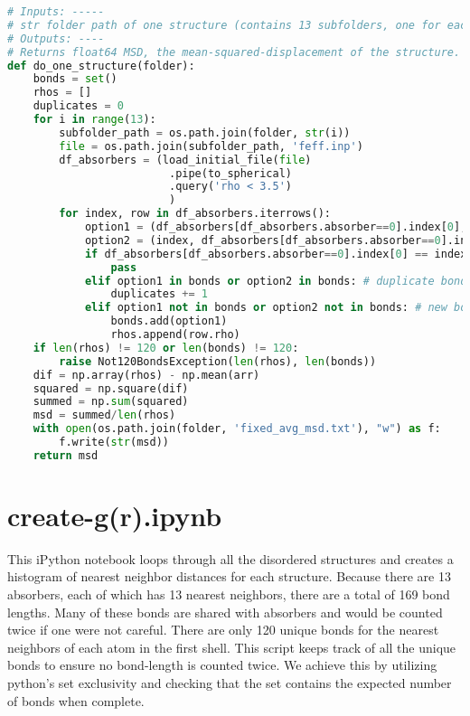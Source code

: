 \pagebreak
\begin{lstlisting}[language=Python]
# Inputs: -----
# str folder path of one structure (contains 13 subfolders, one for each absober)
# Outputs: ----
# Returns float64 MSD, the mean-squared-displacement of the structure.
def do_one_structure(folder):
    bonds = set()
    rhos = []
    duplicates = 0
    for i in range(13):
        subfolder_path = os.path.join(folder, str(i))
        file = os.path.join(subfolder_path, 'feff.inp')
        df_absorbers = (load_initial_file(file)
                         .pipe(to_spherical)
                         .query('rho < 3.5')
                         )
        for index, row in df_absorbers.iterrows():
            option1 = (df_absorbers[df_absorbers.absorber==0].index[0], index)
            option2 = (index, df_absorbers[df_absorbers.absorber==0].index[0])
            if df_absorbers[df_absorbers.absorber==0].index[0] == index:
                pass
            elif option1 in bonds or option2 in bonds: # duplicate bond found
                duplicates += 1
            elif option1 not in bonds or option2 not in bonds: # new bond found
                bonds.add(option1)
                rhos.append(row.rho)
    if len(rhos) != 120 or len(bonds) != 120:
        raise Not120BondsException(len(rhos), len(bonds))
    dif = np.array(rhos) - np.mean(arr)
    squared = np.square(dif)
    summed = np.sum(squared)
    msd = summed/len(rhos)
    with open(os.path.join(folder, 'fixed_avg_msd.txt'), "w") as f:
        f.write(str(msd))
    return msd
\end{lstlisting}



\section{create-g(r).ipynb}

This iPython notebook loops through all the disordered structures and creates a histogram of nearest neighbor distances for each structure. Because there are 13 absorbers, each of which has 13 nearest neighbors, there are a total of 169 bond lengths. Many of these bonds are shared with absorbers and would be counted twice if one were not careful. There are only 120 unique bonds for the nearest neighbors of each atom in the first shell. This script keeps track of all the unique bonds to ensure no bond-length is counted twice. We achieve this by utilizing python's set exclusivity and checking that the set contains the expected number of bonds when complete.


